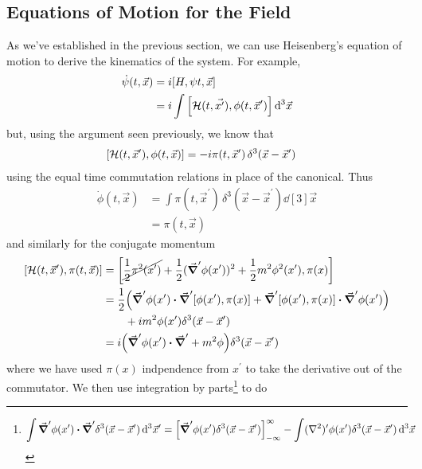 \documentclass[notes.tex]{subfiles}
\begin{document}
\subsection{Equations of Motion for the Field}
As we've established in the previous section, we can use Heisenberg's equation of motion to derive the kinematics of the system.
For example, 
\begin{align*}
    \dot\psi(t, \vec{x}) &= i \commutator{H}{\psi{t, \vec{x}}}\\
    &= i\int \commutator{\mathcal{H}(t, \vec{x^\prime})}{\phi(t, \vec{x}^\prime)} \dd[3]{\vec{x}}
\end{align*}
but, using the argument seen previously, we know that
\begin{align*}
    \commutator{\mathcal{H}(t, \vec{x}^\prime)}{\phi(t, \vec{x})} &= -i\pi(t, \vec{x}^\prime)\, \delta^3(\vec{x} - \vec{x}^\prime)
\end{align*}
using the equal time commutation relations in place of the canonical. 
Thus
\begin{align*}
    \dot{\phi}(t, \vec{x}) &= \int \pi(t, \vec{x}^\prime)\, \delta^3(\vec{x} - \vec{x}^\prime) \dd[3]\vec{x} \\
    &= \pi(t, \vec{x})
\end{align*}
and similarly for the conjugate momentum
\begin{align*}
    \commutator{\mathcal{H}(t, \vec{x}^\prime)}{\pi(t, \vec{x})} &= \commutator{\cancel{\half{}\pi^2(x^\prime)}+\half{}(\grad^\prime\phi(x^\prime))^2 + \half{}m^2\phi^2(x^\prime)}{\pi(x)}\\
    &= \half{}\qty(\grad^\prime\phi(x^\prime)\vdot\grad^\prime\commutator{\phi(x^\prime)}{\pi(x)} + \grad^\prime\commutator{\phi(x^\prime)}{\pi(x)}\vdot \grad^\prime\phi(x^\prime))\\
    &\qquad + im^2\phi(x^\prime)\delta^3(\vec{x} - \vec{x}^\prime)\\
    &= i\qty(\grad^\prime\phi(x^\prime)\vdot\grad^\prime + m^2 \phi)\delta^3(\vec{x} - \vec{x}^\prime)
\end{align*}
where we have used $\pi(x)$ indpendence from $x^\prime$ to take the derivative out of the commutator. 
We then use integration by parts\footnote{\begin{align*}
    \int \grad^\prime\phi(x^\prime)\vdot\grad^\prime \delta^3(\vec{x} - \vec{x}^\prime) \dd[3]{\vec{x}^\prime} &= \qty[\grad^\prime\phi(x^\prime) \delta^3(\vec{x} - \vec{x}^\prime)]_{-\infty}^\infty - \int (\laplacian)^\prime \phi(x^\prime) \delta^3(\vec{x} - \vec{x}^\prime) \dd[3]{\vec{x}}
\end{align*}} to do
\end{document}
